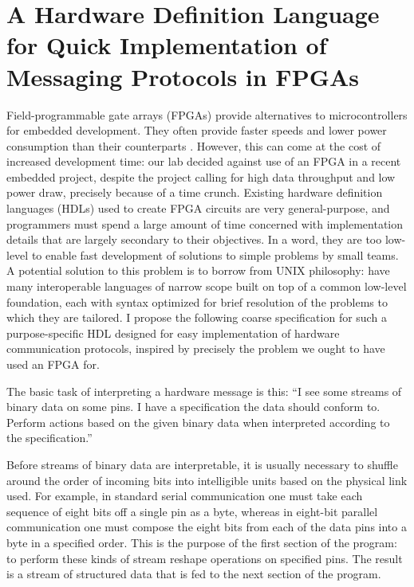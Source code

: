 \documentclass[12pt, arial, letterpaper]{article}
\begin{document}
\section*{A Hardware Definition Language for Quick Implementation of Messaging Protocols in FPGAs}
Field-programmable gate arrays (FPGAs) provide alternatives to microcontrollers for embedded development. They often provide faster speeds and lower power consumption than their counterparts \cite{mal}. However, this can come at the cost of increased development time: our lab decided against use of an FPGA in a recent embedded project, despite the project calling for high data throughput and low power draw, precisely because of a time crunch. Existing hardware definition languages (HDLs) used to create FPGA circuits \cite{vlog}\cite{vhdl} are very general-purpose, and programmers must spend a large amount of time concerned with implementation details that are largely secondary to their objectives. In a word, they are too low-level to enable fast development of solutions to simple problems by small teams. A potential solution to this problem is to borrow from UNIX philosophy: have many interoperable languages of narrow scope built on top of a common low-level foundation, each with syntax optimized for brief resolution of the problems to which they are tailored. I propose the following coarse specification for such a purpose-specific HDL designed for easy implementation of hardware communication protocols, inspired by precisely the problem we ought to have used an FPGA for.
\newline

The basic task of interpreting a hardware message is this:
``I see some streams of binary data on some pins.
I have a specification the data should conform to.
Perform actions based on the given binary data when interpreted according to the specification.''
\newline

Before streams of binary data are interpretable, it is usually necessary to shuffle around the order of incoming bits into intelligible units based on the physical link used. For example, in standard serial communication one must take each sequence of eight bits off a single pin as a byte, whereas in eight-bit parallel communication one must compose the eight bits from each of the data pins into a byte in a specified order. This is the purpose of the first section of the program: to perform these kinds of stream reshape operations on specified pins. The result is a stream of structured data that is fed to the next section of the program.
\newline
\end{document}
